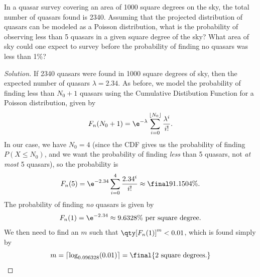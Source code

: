 \documentclass[10pt, physics, diagram]{homework}
\newcommand\floor[1]{\left\lfloor #1 \right\rfloor}
\newcommand\ceiling[1]{\left\lceil #1 \right\rceil}
\begin{document}
	\begin{problem}[4pts]
		In a quasar survey covering an area of 1000 square degrees on the sky, the total number of quasars found is 2340. Assuming that the projected distribution of quasars can be modeled as a Poisson distribution, what is the probability of observing less than 5 quasars in a given square degree of the sky? What area of sky could one expect to survey before the probability of finding no quasars was less than 1\%?
	\end{problem}
	\begin{proof}[Solution]
		If 2340 quasars were found in 1000 square degrees of sky, then the expected number of quasars $\lambda = 2.34$.
		As before, we model the probability of finding less than $N_0 + 1$ quasars using the Cumulative Distibution Function for a Poisson distribution, given by
		\[ F_n(N_0 + 1) = \e^{-\lambda} \sum_{i = 0}^{\floor{N_0}} \frac{\lambda^i}{i!}. \]
		In our case, we have $N_0 = 4$ (since the CDF gives us the probability of finding $P(X \leq N_0)$, and we want the probability of finding \emph{less} than 5 quasars, not \emph{at most} 5 quasars), so the probability is
		\[ F_n(5) = \e^{-2.34} \sum_{i=0}^4 \frac{2.34^i}{i!} \approx \final{91.1504\%.} \]
		The probability of finding \emph{no} quasars is given by 
		\[ F_n(1) = \e^{-2.34} \approx 9.6328\% \text{ per square degree.} \]
		We then need to find an $m$ such that $\qty[F_n(1)]^m < 0.01$, which is found simply by
		\[ m = \ceiling{\log_{0.096328}(0.01)} = \final{2 \text{ square degrees.}} \qedhere \]
	\end{proof}
\end{document}
